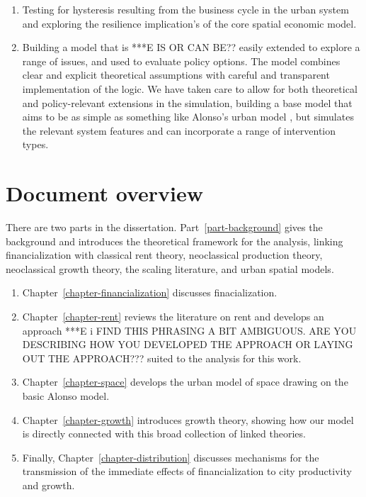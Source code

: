 \begin{enumerate}
    \item Testing for \gls{hysteresis} resulting from the business cycle in the urban system and exploring the \gls{resilience} implication's of the core spatial economic model.

    \item Building a model that is ***E IS OR CAN BE?? easily extended to explore a range of issues, and used to evaluate policy options. The model combines clear and explicit theoretical assumptions with careful and transparent implementation of the logic. We have taken care to allow for both theoretical and policy-relevant extensions in the simulation,  building a base model that aims to be as simple as something like Alonso's urban model \cite{alonsoLocationLandUse1964}, but simulates the relevant system features and can incorporate a range of intervention types. 
\end{enumerate}


\section{Document overview}
There are two parts in the dissertation. Part~\ref{part-background} gives the background and introduces the theoretical framework for the analysis, linking financialization with classical rent theory, neoclassical production theory, neoclassical growth theory, the scaling literature, and urban spatial models. 

\begin{enumerate}
    \item Chapter~\ref{chapter-financialization} discusses finacialization.

    \item Chapter~\ref{chapter-rent} reviews the literature on rent and develops an approach ***E  i FIND THIS PHRASING A  BIT AMBIGUOUS. ARE YOU DESCRIBING HOW YOU DEVELOPED THE APPROACH OR LAYING OUT THE APPROACH??? suited to the analysis for this work.

    \item Chapter~\ref{chapter-space} develops the urban model of space drawing on the basic Alonso model.

    \item Chapter~\ref{chapter-growth} introduces growth theory, showing how our model is directly connected with this broad collection of linked theories. 

    \item Finally, Chapter~\ref{chapter-distribution} discusses mechanisms for the transmission of the immediate effects of financialization to city productivity and growth.
\end{enumerate}
 
